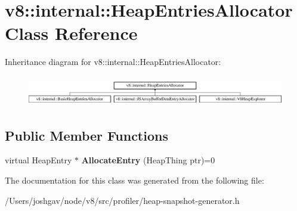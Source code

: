 \hypertarget{classv8_1_1internal_1_1_heap_entries_allocator}{}\section{v8\+:\+:internal\+:\+:Heap\+Entries\+Allocator Class Reference}
\label{classv8_1_1internal_1_1_heap_entries_allocator}
Inheritance diagram for v8\+:\+:internal\+:\+:Heap\+Entries\+Allocator\+:\begin{figure}[H]
\begin{center}
\leavevmode
\includegraphics[height=1.342926cm]{classv8_1_1internal_1_1_heap_entries_allocator}
\end{center}
\end{figure}
\subsection*{Public Member Functions}
\begin{DoxyCompactItemize}
\item 
virtual Heap\+Entry $\ast$ {\bfseries Allocate\+Entry} (Heap\+Thing ptr)=0\hypertarget{classv8_1_1internal_1_1_heap_entries_allocator_a50db4f7564a26290843caffad619edbb}{}\label{classv8_1_1internal_1_1_heap_entries_allocator_a50db4f7564a26290843caffad619edbb}

\end{DoxyCompactItemize}


The documentation for this class was generated from the following file\+:\begin{DoxyCompactItemize}
\item 
/\+Users/joshgav/node/v8/src/profiler/heap-\/snapshot-\/generator.\+h\end{DoxyCompactItemize}
